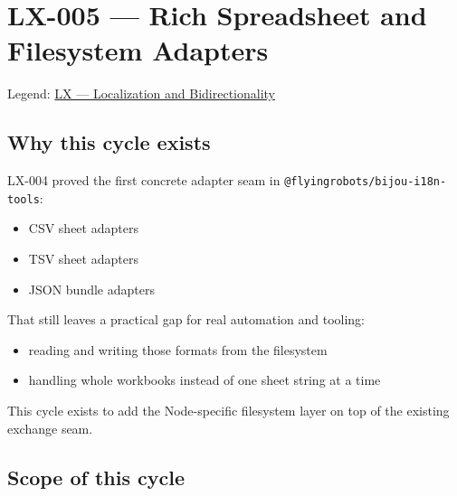 \chapter{LX-005 --- Rich Spreadsheet and Filesystem Adapters}\label{record-192}

\smallskip

Legend: \href{https://github.com/flyingrobots/bijou/blob/1853ad902f6bf219326409e7f743a5a1d6517dbc/docs/legends/LX-localization-and-bidirectionality.md}{LX --- Localization and Bidirectionality}

\section{Why this cycle exists}\label{record-192-why-this-cycle-exists}

LX-004 proved the first concrete adapter seam in \texttt{@\allowbreak{}f\allowbreak{}l\allowbreak{}y\allowbreak{}i\allowbreak{}n\allowbreak{}g\allowbreak{}r\allowbreak{}o\allowbreak{}b\allowbreak{}o\allowbreak{}t\allowbreak{}s\allowbreak{}/\allowbreak{}b\allowbreak{}i\allowbreak{}j\allowbreak{}o\allowbreak{}u\allowbreak{}-\allowbreak{}i\allowbreak{}1\allowbreak{}8\allowbreak{}n\allowbreak{}-\allowbreak{}t\allowbreak{}o\allowbreak{}o\allowbreak{}l\allowbreak{}s}:

\begin{itemize}
\tightlist
\item
  CSV sheet adapters
\item
  TSV sheet adapters
\item
  JSON bundle adapters
\end{itemize}

That still leaves a practical gap for real automation and tooling:

\begin{itemize}
\tightlist
\item
  reading and writing those formats from the filesystem
\item
  handling whole workbooks instead of one sheet string at a time
\end{itemize}

This cycle exists to add the Node-specific filesystem layer on top of the existing exchange seam.

\section{Scope of this cycle}\label{record-192-scope-of-this-cycle}

